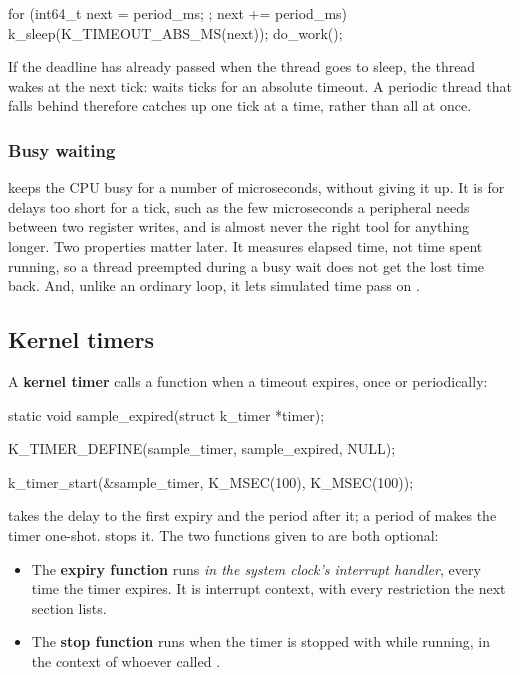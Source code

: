 \begin{ccode}
for (int64_t next = period_ms; ; next += period_ms) {
	k_sleep(K_TIMEOUT_ABS_MS(next));
	do_work();
}
\end{ccode}

\noindent If the deadline has already passed when the thread goes to sleep, the thread wakes at the
next tick:  waits  ticks for an absolute timeout. A
periodic thread that falls behind therefore catches up one tick at a time, rather than all at once.

\subsubsection{Busy waiting}
 keeps the CPU busy for a number of microseconds, without giving it up. It
is for delays too short for a tick, such as the few microseconds a peripheral needs between two
register writes, and is almost never the right tool for anything longer. Two properties matter
later. It measures elapsed time, not time spent running, so a thread preempted during a busy wait
does not get the lost time back. And, unlike an ordinary loop, it lets simulated time pass on
.

\subsection{Kernel timers}
A \textbf{kernel timer} calls a function when a timeout expires, once or periodically:

\begin{ccode}
static void sample_expired(struct k_timer *timer);

K_TIMER_DEFINE(sample_timer, sample_expired, NULL);

k_timer_start(&sample_timer, K_MSEC(100), K_MSEC(100));
\end{ccode}

\noindent {} takes the delay to the first expiry and the period after it; a
period of  makes the timer one-shot.  stops it. The two
functions given to  are both optional:

\begin{itemize}
  \item The \textbf{expiry function} runs \emph{in the system clock’s interrupt handler}, every time the
    timer expires. It is interrupt context, with every restriction the next section lists.
  \item The \textbf{stop function} runs when the timer is stopped with  while running,
    in the context of whoever called .
\end{itemize}

